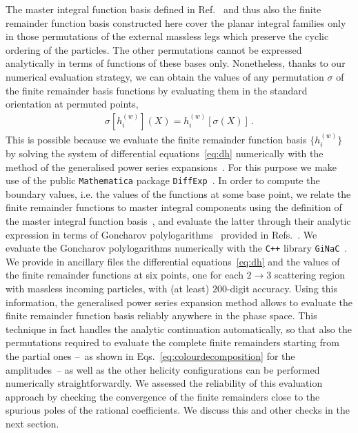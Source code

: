 \documentclass[main.tex]{subfiles}
\begin{document}
The master integral function basis defined in Ref.~\cite{Badger:2021nhg} and thus also the finite remainder function basis constructed here cover the planar integral families only in those permutations of the external massless legs which preserve the cyclic ordering of the particles. The other permutations cannot be expressed analytically in terms of functions of these bases only. Nonetheless, thanks to our numerical evaluation strategy, we can obtain the values of any permutation $\sigma$ of the finite remainder basis functions by evaluating them in the standard orientation at permuted points,
\begin{align}
\sigma \left[ h^{(w)}_i \right] (X) =  h^{(w)}_i \left[\sigma\left(X\right)\right] \,.
\end{align}
This is possible because 
we evaluate the finite remainder function basis $\{h^{(w)}_i\}$ by solving the system of differential equations~\eqref{eq:dh} numerically with the method of the generalised power series expansions~\cite{Francesco:2019yqt}. For this purpose we make use of the public \texttt{Mathematica} package \texttt{DiffExp}~\cite{Hidding:2020ytt}. In order to compute the boundary values, i.e. the values of the functions at some base point, we relate the finite remainder functions to master integral components using the definition of the master integral function basis~\cite{Badger:2021nhg}, and evaluate the latter through their analytic expression in terms of Goncharov polylogarithms~\cite{2011arXiv1105.2076G,Remiddi:1999ew,2001math......3059G} provided in Refs.~\cite{Papadopoulos:2015jft,Syrrakos:2020kba,Canko:2020ylt}. We evaluate the Goncharov polylogarithms numerically with the \texttt{C++} library \texttt{GiNaC}~\cite{Vollinga:2004sn}. We provide in ancillary files the differential equations~\eqref{eq:dh} and the values of the finite remainder functions at six points, one for each $2\to 3$ scattering region with massless incoming particles, with (at least) $200$-digit accuracy. Using this information, the generalised power series expansion method allows to evaluate the finite remainder function basis reliably anywhere in the phase space. This technique in fact handles the analytic continuation automatically, so that also the permutations required to evaluate the complete finite remainders starting from the partial ones --~as shown in Eqs.~\eqref{eq:colourdecomposition} for the amplitudes~-- as well as the other helicity configurations can be performed numerically straightforwardly. We assessed the reliability of this evaluation approach by checking the convergence of the finite remainders close to the spurious poles of the rational coefficients. We discuss this and other checks in the next section.
\end{document}
